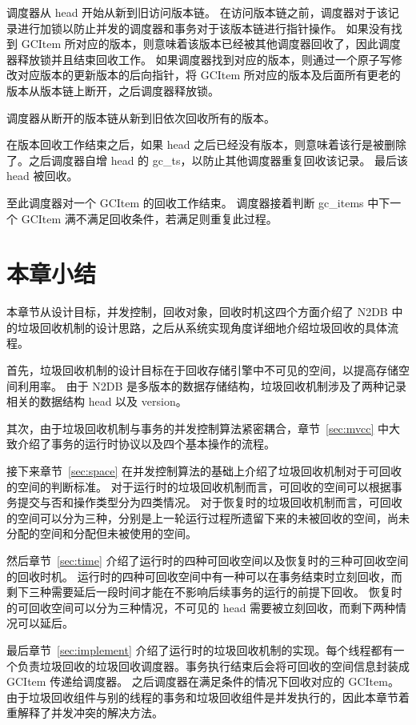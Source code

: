 调度器从 head 开始从新到旧访问版本链。
在访问版本链之前，调度器对于该记录进行加锁以防止并发的调度器和事务对于该版本链进行指针操作。
如果没有找到 GCItem 所对应的版本，则意味着该版本已经被其他调度器回收了，因此调度器释放锁并且结束回收工作。
如果调度器找到对应的版本，则通过一个原子写修改对应版本的更新版本的后向指针，将 GCItem 所对应的版本及后面所有更老的版本从版本链上断开，之后调度器释放锁。

调度器从断开的版本链从新到旧依次回收所有的版本。

在版本回收工作结束之后，如果 head 之后已经没有版本，则意味着该行是被删除了。之后调度器自增 head 的 gc\_ts，以防止其他调度器重复回收该记录。
最后该 head 被回收。

至此调度器对一个 GCItem 的回收工作结束。
调度器接着判断 gc\_items 中下一个 GCItem 满不满足回收条件，若满足则重复此过程。


\section{本章小结}

本章节从设计目标，并发控制，回收对象，回收时机这四个方面介绍了 N2DB 中的垃圾回收机制的设计思路，之后从系统实现角度详细地介绍垃圾回收的具体流程。

首先，垃圾回收机制的设计目标在于回收存储引擎中不可见的空间，以提高存储空间利用率。
由于 N2DB 是多版本的数据存储结构，垃圾回收机制涉及了两种记录相关的数据结构 head 以及 version。

其次，由于垃圾回收机制与事务的并发控制算法紧密耦合，章节~\ref{sec:mvcc} 中大致介绍了事务的运行时协议以及四个基本操作的流程。

接下来章节~\ref{sec:space} 在并发控制算法的基础上介绍了垃圾回收机制对于可回收的空间的判断标准。
对于运行时的垃圾回收机制而言，可回收的空间可以根据事务提交与否和操作类型分为四类情况。
对于恢复时的垃圾回收机制而言，可回收的空间可以分为三种，分别是上一轮运行过程所遗留下来的未被回收的空间，尚未分配的空间和分配但未被使用的空间。

然后章节~\ref{sec:time} 介绍了运行时的四种可回收空间以及恢复时的三种可回收空间的回收时机。
运行时的四种可回收空间中有一种可以在事务结束时立刻回收，而剩下三种需要延后一段时间才能在不影响后续事务的运行的前提下回收。
恢复时的可回收空间可以分为三种情况，不可见的 head 需要被立刻回收，而剩下两种情况可以延后。

最后章节~\ref{sec:implement} 介绍了运行时的垃圾回收机制的实现。每个线程都有一个负责垃圾回收的垃圾回收调度器。事务执行结束后会将可回收的空间信息封装成 GCItem 传递给调度器。
之后调度器在满足条件的情况下回收对应的 GCItem。
由于垃圾回收组件与别的线程的事务和垃圾回收组件是并发执行的，因此本章节着重解释了并发冲突的解决方法。
